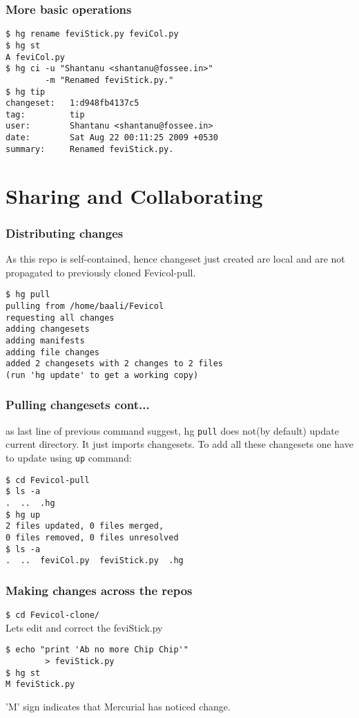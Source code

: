 \documentclass[14pt,compress]{beamer}
\newcommand{\typ}[1]{\lstinline{#1}}
\begin{document}
\begin{frame}[fragile]
  \frametitle{More basic operations}
  \begin{lstlisting}
$ hg rename feviStick.py feviCol.py
$ hg st
A feviCol.py
$ hg ci -u "Shantanu <shantanu@fossee.in>" 
        -m "Renamed feviStick.py."
$ hg tip
changeset:   1:d948fb4137c5
tag:         tip
user:        Shantanu <shantanu@fossee.in>
date:        Sat Aug 22 00:11:25 2009 +0530
summary:     Renamed feviStick.py.
  \end{lstlisting}
\end{frame}

\section{Sharing and Collaborating}

\begin{frame}[fragile]
  \frametitle{Distributing changes}
  As this repo is self-contained, hence changeset just created are local and are not propagated to previously cloned Fevicol-pull.
  \begin{lstlisting}
$ hg pull 
pulling from /home/baali/Fevicol
requesting all changes
adding changesets
adding manifests
adding file changes
added 2 changesets with 2 changes to 2 files
(run 'hg update' to get a working copy)
  \end{lstlisting} %
\end{frame}

\begin{frame}[fragile]
  \frametitle{Pulling changesets cont...}
  as last line of previous command suggest, hg \typ{pull} does not(by default) update current directory. It just imports changesets. To add all these changesets one have to update using \typ{up} command:
  \begin{lstlisting}
$ cd Fevicol-pull
$ ls -a
.  ..  .hg
$ hg up
2 files updated, 0 files merged, 
0 files removed, 0 files unresolved
$ ls -a
.  ..  feviCol.py  feviStick.py  .hg    
  \end{lstlisting}
\end{frame}

\begin{frame}[fragile]
  \frametitle{Making changes across the repos}
  \typ{$ cd Fevicol-clone/}\\ %
  Lets edit and correct the feviStick.py 
\begin{lstlisting}
$ echo "print 'Ab no more Chip Chip'" 
        > feviStick.py
$ hg st
M feviStick.py
\end{lstlisting}
  'M' sign indicates that Mercurial has noticed change.\\
\end{frame}
\end{document}
